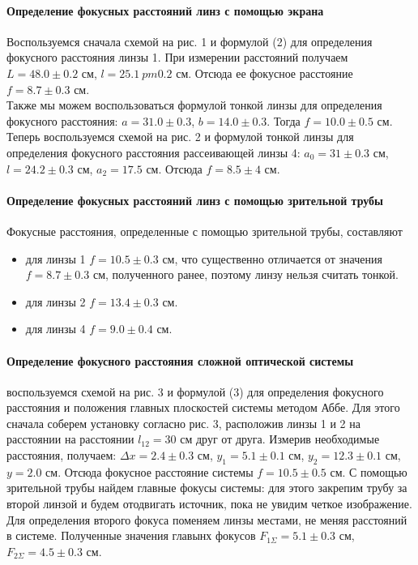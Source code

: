 \documentclass[a4paper,12pt]{article}
\begin{document}
\paragraph{Определение фокусных расстояний линз с помощью экрана}
Воспользуемся сначала схемой на рис. 1 и формулой (2) для определения фокусного расстояния линзы 1. При измерении расстояний получаем $L = 48.0 \pm 0.2$ см, $l = 25.1 \ pm 0.2$ см. Отсюда ее фокусное расстояние $f = 8.7 \pm 0.3$ см. \\
Также мы можем воспользоваться формулой тонкой линзы для определения фокусного расстояния: $a = 31.0 \pm 0.3$, $b = 14.0 \pm 0.3$. Тогда $f = 10.0 \pm 0.5$ см. \\
Теперь воспользуемся схемой на рис. 2 и формулой тонкой линзы для определения фокусного расстояния рассеивающей линзы 4: $a_0 = 31 \pm 0.3$ см, $l = 24.2 \pm 0.3$ см, $a_2 = 17.5$ см. Отсюда $f = 8.5 \pm 4$ см.

\paragraph{Определение фокусных расстояний линз с помощью зрительной трубы}
Фокусные расстояния, определенные с помощью зрительной трубы, составляют
\begin{itemize}
    \item для линзы 1 $f = 10.5 \pm 0.3$ см, что существенно отличается от значения $f = 8.7 \pm 0.3$ см, полученного ранее, поэтому линзу нельзя считать тонкой.
    \item для линзы 2 $f = 13.4 \pm 0.3$ см.
    \item для линзы 4 $f = 9.0 \pm 0.4$ см.
\end{itemize}

\paragraph{Определение фокусного расстояния сложной оптической системы} воспользуемся схемой на рис. 3 и формулой (3) для определения фокусного расстояния и положения главных плоскостей системы методом Аббе. Для этого сначала соберем установку согласно рис. 3, расположив линзы 1 и 2 на расстоянии  на расстоянии $l_{12} = 30$ см друг от друга. Измерив необходимые расстояния, получаем: $\Delta x = 2.4 \pm 0.3$ см, $y_1 = 5.1 \pm 0.1$ см, $y_2 = 12.3 \pm 0.1$ см, $y = 2.0$ см. Отсюда фокусное расстояние системы $f = 10.5 \pm 0.5$ см. С помощью зрительной трубы найдем главные фокусы системы: для этого закрепим трубу за второй линзой и будем отодвигать источник, пока не увидим четкое изображение. Для определения второго фокуса поменяем линзы местами, не меняя расстояний в системе. Полученные значения главынх фокусов $F_{1\Sigma} = 5.1 \pm 0.3$ см, $F_{2\Sigma} = 4.5 \pm 0.3$ см.
\end{document}
